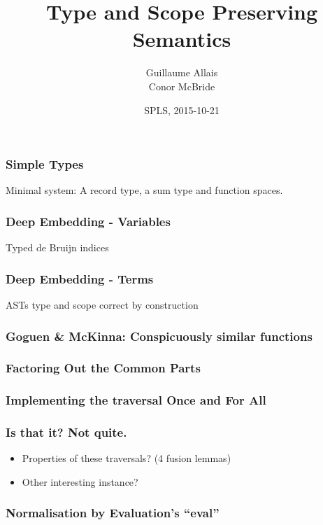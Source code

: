\documentclass[xetex, mathserif, serif]{beamer}
\title{Type and Scope Preserving Semantics}
\author[me]{Guillaume Allais\\[3mm]Conor McBride}
\institute{University of Strathclyde}
\date{SPLS, 2015-10-21}
\begin{document}
 
  \begin{frame}
    \titlepage
  \end{frame}

  \begin{frame}\frametitle{Simple Types}
    Minimal system: A record type, a sum type and function spaces.

    \unskip
    \unskip
  \end{frame}

  \begin{frame}\frametitle{Deep Embedding - Variables}
    Typed de Bruijn indices

    \unskip
  \end{frame}
  \begin{frame}\frametitle{Deep Embedding - Terms}
    ASTs type and scope correct by construction

    \unskip
  \end{frame}

  \begin{frame}\frametitle{Goguen \& McKinna: Conspicuously similar functions}
    \unskip
    \unskip
  \end{frame}

  \begin{frame}\frametitle{Factoring Out the Common Parts}
    \unskip
  \end{frame}

  \begin{frame}\frametitle{Implementing the traversal Once and For All}
    \unskip
    \unskip
  \end{frame}

  \begin{frame}\frametitle{Is that it? Not quite.}
    \begin{itemize}
      \item Properties of these traversals? (4 fusion lemmas)
      \item Other interesting instance?
    \end{itemize}
  \end{frame}

  \begin{frame}\frametitle{Normalisation by Evaluation's ``eval''}
  \end{frame}
\end{document}
